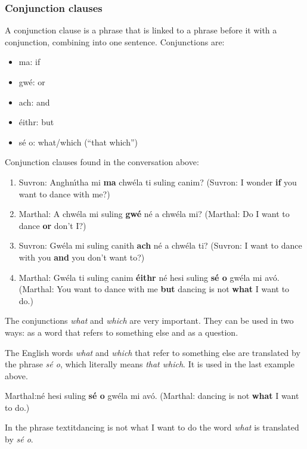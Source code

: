 \subsubsection{Conjunction clauses}

A conjunction clause is a phrase that is linked to a phrase before it with a conjunction, combining into one sentence. Conjunctions are:

\begin{itemize}
  \item ma: if
  \item gw\'{e}: or
  \item ach: and
  \item \'{e}ithr: but
  \item s\'{e} o: what/which (``that which'')
\end{itemize}

Conjunction clauses found in the conversation above:
\begin{enumerate}
  \item Suvron: Anghn\'{\i}tha mi \textbf{ma} chw\'{e}la ti suling canim?
(Suvron: I wonder \textbf{if} you want to dance with me?)
  \item Marthal: A chw\'{e}la mi suling \textbf{gw\'{e}} n\'{e} a chw\'{e}la mi?
(Marthal: Do I want to dance \textbf{or} don't I?)
  \item Suvron: Gw\'{e}la mi suling canith \textbf{ach} n\'{e} a chw\'{e}la ti?
(Suvron: I want to dance with you \textbf{and} you don't want to?)
\item Marthal: Gw\'{e}la ti suling canim \textbf{\'{e}ithr} n\'{e} hesi suling \textbf{s\'{e} o} gw\'{e}la mi av\'{o}.
(Marthal: You want to dance with me \textbf{but} dancing is not \textbf{what} I want to do.)
\end{enumerate}

The conjunctions \textit{what} and \textit{which} are very important. They can be used in two ways: as a word that refers to something else and as a question.

The English words \textit{what} and \textit{which} that refer to something else are translated by the phrase \textit{s\'{e} o}, which literally means \textit{that which}. It is used in the last example above.

Marthal:n\'{e} hesi suling \textbf{s\'{e} o} gw\'{e}la mi av\'{o}.
(Marthal: dancing is not \textbf{what} I want to do.)

In the phrase textit{dancing is not what I want to do} the word \textit{what} is translated by \textit{s\'{e} o}.

